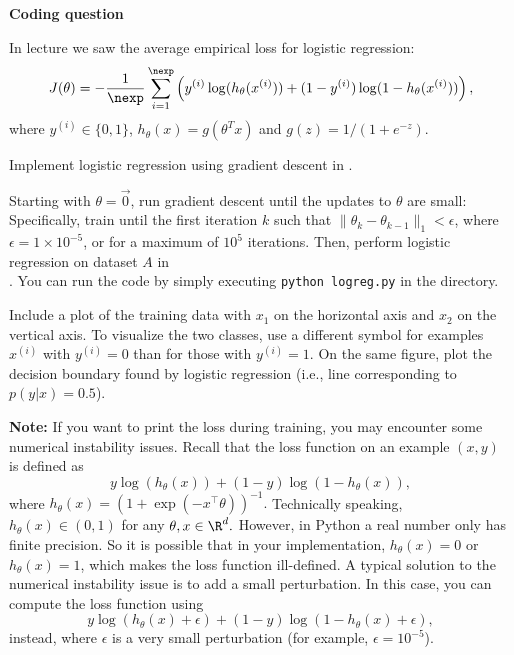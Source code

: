 \item {} \textbf{Coding question}

In lecture we saw the average empirical loss for logistic regression:
\begin{equation*}
	J(\theta)
	= -\frac{1}{\nexp} \sum_{i=1}^\nexp \left(y^{(i)}\log(h_{\theta}(x^{(i)}))
		+  (1 - y^{(i)})\log(1 - h_{\theta}(x^{(i)}))\right),
\end{equation*}
where $y^{(i)} \in \{0, 1\}$, $h_\theta(x) = g(\theta^T x)$ and
$g(z) = 1 / (1 + e^{-z})$.

Implement logistic regression using gradient descent in
.

Starting with $\theta = \vec{0}$, run gradient descent until the updates to
$\theta$ are small: Specifically, train until the first iteration $k$ such
that $\|\theta_{k} - \theta_{k-1}\|_1 < \epsilon$, where
$\epsilon = 1\times 10^{-5}$, or for a maximum of $10^5$ iterations. Then, perform logistic regression on dataset $A$ in \\
. You can run the code by simply executing
\texttt{python logreg.py} in the  directory.

Include a plot of the training data with $x_1$ on the horizontal axis and $x_2$ on the vertical axis.
To visualize the two classes, use a different symbol for examples $x^{(i)}$
with $y^{(i)} = 0$ than for those with $y^{(i)} = 1$. On the same figure, plot the decision boundary
found by logistic regression (i.e., line corresponding to $p(y|x) = 0.5$).

\textbf{Note:} If you want to print the loss during training, you may encounter some numerical instability issues. Recall that the loss function on an example $(x,y)$ is defined as
$$y\log(h_{\theta}(x)) +  (1 - y)\log(1 - h_{\theta}(x)),$$
where $h_\theta(x)=(1+\exp(-x^\top \theta))^{-1}.$ Technically speaking, $h_{\theta}(x)\in(0,1)$ for any $\theta,x\in\R^{d}.$ However, in Python a real number only has finite precision. So it is possible that in your implementation, $h_{\theta}(x)=0$ or $h_{\theta}(x)=1$, which makes the loss function ill-defined. A typical solution to the numerical instability issue is to add a small perturbation. In this case, you can compute the loss function using
$$y\log(h_{\theta}(x) + \epsilon) +  (1 - y)\log(1 - h_{\theta}(x) + \epsilon),$$
instead, where $\epsilon$ is a very small perturbation (for example, $\epsilon=10^{-5}$).
